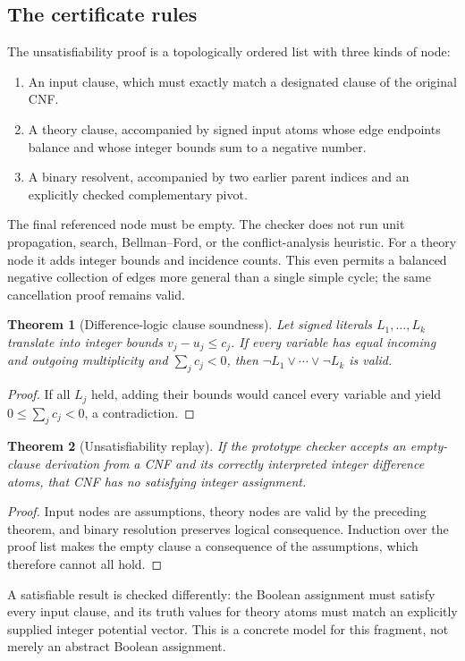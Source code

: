 \documentclass[11pt,letterpaper]{article}
\newtheorem{theorem}{Theorem}[section]
\theoremstyle{definition}\newtheorem{definition}[theorem]{Definition}
\theoremstyle{remark}\newtheorem{remark}[theorem]{Remark}
\begin{document}
\subsection{The certificate rules}
The unsatisfiability proof is a topologically ordered list with three kinds of node:
\begin{enumerate}[leftmargin=1.8em,itemsep=2pt]
\item An input clause, which must exactly match a designated clause of the original CNF.
\item A theory clause, accompanied by signed input atoms whose edge endpoints balance and whose integer bounds sum to a negative number.
\item A binary resolvent, accompanied by two earlier parent indices and an explicitly checked complementary pivot.
\end{enumerate}
The final referenced node must be empty. The checker does not run unit propagation, search, Bellman--Ford, or the conflict-analysis heuristic. For a theory node it adds integer bounds and incidence counts. This even permits a balanced negative collection of edges more general than a single simple cycle; the same cancellation proof remains valid.

\begin{theorem}[Difference-logic clause soundness]
Let signed literals $L_1,\ldots,L_k$ translate into integer bounds $v_j-u_j\le c_j$. If every variable has equal incoming and outgoing multiplicity and $\sum_jc_j<0$, then $\neg L_1\lor\cdots\lor\neg L_k$ is valid.
\end{theorem}
\begin{proof}
If all $L_j$ held, adding their bounds would cancel every variable and yield $0\le\sum_jc_j<0$, a contradiction.
\end{proof}
\begin{theorem}[Unsatisfiability replay]
If the prototype checker accepts an empty-clause derivation from a CNF and its correctly interpreted integer difference atoms, that CNF has no satisfying integer assignment.
\end{theorem}
\begin{proof}
Input nodes are assumptions, theory nodes are valid by the preceding theorem, and binary resolution preserves logical consequence. Induction over the proof list makes the empty clause a consequence of the assumptions, which therefore cannot all hold.
\end{proof}
A satisfiable result is checked differently: the Boolean assignment must satisfy every input clause, and its truth values for theory atoms must match an explicitly supplied integer potential vector. This is a concrete model for this fragment, not merely an abstract Boolean assignment.
\end{document}
